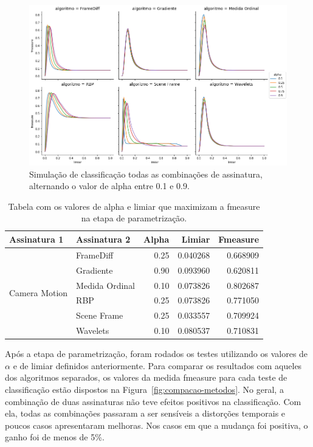 \begin{figure}[h]
	\centering
	\caption{Simulação de classificação todas as combinações de assinatura, alternando o valor de alpha entre 0.1 e 0.9.}
	\label{fig:alpha-limiar}
	\includegraphics[width=\textwidth]{dados/figuras/experimentos/alpha_juncao.png}
\end{figure}

\begin{table}[h]
\centering
\caption{Tabela com os valores de alpha e limiar que maximizam a fmeasure na etapa de parametrização.}
\label{tab:juncao-limiares-alpha}
\begin{tabular}{|l|l|r|r|r|}
\hline
\textbf{Assinatura 1} & \textbf{Assinatura 2} & \textbf{Alpha} & \textbf{Limiar} & \textbf{Fmeasure} \\\hline
\multirow{6}{*}{Camera Motion} & FrameDiff & 0.25 & 0.040268 & 0.668909 \\\cline{2-5}
& Gradiente & 0.90 & 0.093960 & 0.620811 \\\cline{2-5}
& Medida Ordinal & 0.10 & 0.073826 & 0.802687 \\\cline{2-5}
& RBP & 0.25 & 0.073826 & 0.771050 \\\cline{2-5}
& Scene Frame & 0.25 & 0.033557 & 0.709924 \\\cline{2-5}
& Wavelets & 0.10 & 0.080537 & 0.710831 \\\hline
	\end{tabular}
\end{table}

Após a etapa de parametrização, foram rodados os testes utilizando os valores de $\alpha$ e de limiar definidos anteriormente. Para comparar os resultados com aqueles dos algoritmos separados, os valores da medida fmeasure para cada teste de classificação estão dispostos na Figura~\ref{fig:compacao-metodos}. No geral, a combinação de duas assinaturas não teve efeitos positivos na classificação. Com ela, todas as combinações passaram a ser sensíveis a distorções temporais e poucos casos apresentaram melhoras. Nos casos em que a mudança foi positiva, o ganho foi de menos de 5\%. 

